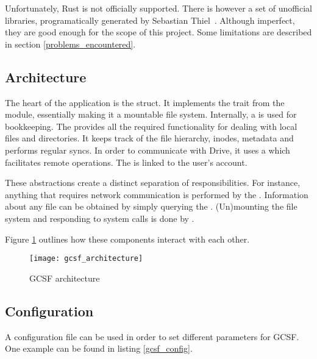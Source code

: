 Unfortunately, Rust is not officially supported. There is however a set of unofficial libraries, programatically generated by Sebastian Thiel~\cite{google_apis_rs,sebastian_thiel}. Although imperfect, they are good enough for the scope of this project. Some limitations are described in section \ref{problems_encountered}.

\subsection{Architecture}

The heart of the application is the  struct. It implements the  trait from the  module, essentially making it a mountable file system. Internally, a  is used for bookkeeping. The  provides all the required functionality for dealing with local files and directories. It keeps track of the file hierarchy, inodes, metadata and performs regular syncs. In order to communicate with Drive, it uses a  which facilitates remote operations. The  is linked to the user's account.

These abstractions create a distinct separation of responsibilities. For instance, anything that requires network communication is performed by the . Information about any file can be obtained by simply querying the . (Un)mounting the file system and responding to system calls is done by .

Figure \ref{fig:gcsf_architecture} outlines how these components interact with each other.

\begin{figure}[bpt]
\caption{GCSF architecture}
\label{fig:gcsf_architecture}
\centering
\texttt{[image: gcsf\_architecture]}
\end{figure}

\subsection{Configuration}

A configuration file can be used in order to set different parameters for GCSF. One example can be found in listing \ref{gcsf_config}. 

